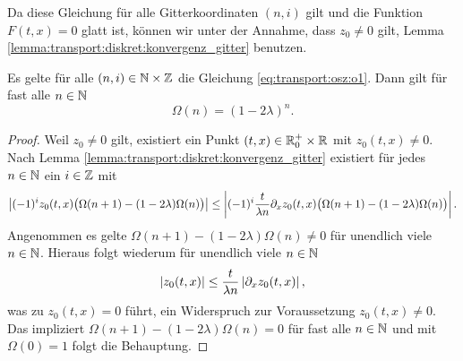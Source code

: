 Da diese Gleichung für alle Gitterkoordinaten $(n,i)$ gilt und die Funktion $F(t,x) = 0$ glatt ist, können wir unter der Annahme, dass $z_0 \neq 0$ gilt, Lemma \ref{lemma:transport:diskret:konvergenz_gitter} benutzen.
\begin{satz}\label{satz:omega_n}
Es gelte für alle $(n,i) \in \mathbb N \times \mathbb Z$ die Gleichung \eqref{eq:transport:osz:o1}. Dann gilt für fast alle $n \in \mathbb N$
\[ \Omega(n) = (1 - 2 \lambda)^n. \]
\end{satz}
\begin{proof}
Weil $z_0 \neq 0$ gilt, existiert ein Punkt $(t,x) \in \mathbb R^+_0 \times \mathbb R$ mit $z_0(t,x) \neq 0$.
Nach Lemma \ref{lemma:transport:diskret:konvergenz_gitter} existiert für jedes $n \in \mathbb N$ ein $i \in \mathbb Z$ mit
\[  \left| (-1)^i z_0(t, x) \bigl( \Omega(n+1) - ( 1 - 2 \lambda ) \Omega(n) \bigr) \right| \leq \left| (-1)^i \frac {t}{\lambda n} \partial_x z_0(t, x) \bigl( \Omega(n+1) - ( 1 - 2 \lambda ) \Omega(n) \bigr) \right|. \]
Angenommen es gelte $\Omega(n+1) - ( 1 - 2 \lambda ) \Omega(n) \neq 0$ für unendlich viele $n \in \mathbb N$.
Hieraus folgt wiederum für unendlich viele $n \in \mathbb N$
\[ \left| z_0(t, x) \right| \leq \frac {t}{\lambda n} \left| \partial_x z_0(t,x) \right|, \]
was zu $z_0(t,x) = 0$ führt, ein Widerspruch zur Voraussetzung $z_0(t,x) \neq 0$.
Das impliziert $\Omega(n+1) - ( 1 - 2 \lambda ) \Omega(n) = 0$ für fast alle $n \in \mathbb N$ und mit $\Omega(0) = 1$ folgt die Behauptung.
\end{proof}

